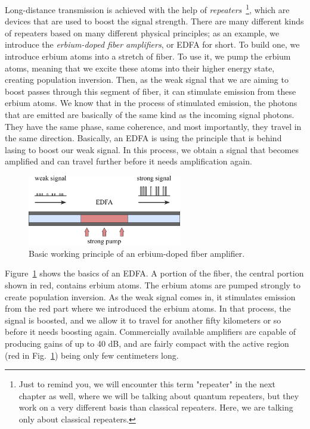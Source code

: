 Long-distance transmission is achieved with the help of \emph{repeaters}~\footnote{Just to remind you, we will encounter this term "repeater" in the next chapter as well, where we will be talking about quantum repeaters, but they work on a very different basis than classical repeaters. Here, we are talking only about classical repeaters.}, which are devices that are used to boost the signal strength. There are many different kinds of repeaters based on many different physical principles; as an example, we introduce the \emph{erbium-doped fiber amplifiers}, or EDFA for short. To build one, we introduce erbium atoms into a stretch of fiber. To use it, we pump the erbium atoms, meaning that we excite these atoms into their higher energy state, creating population inversion. Then, as the weak signal that we are aiming to boost passes through this segment of fiber, it can stimulate emission from these erbium atoms. We know that in the process of stimulated emission, the photons that are emitted are basically of the same kind as the incoming signal photons. They have the same phase, same coherence, and most importantly, they travel in the same direction. Basically, an EDFA is using the principle that is behind lasing to boost our weak signal. In this process, we obtain a signal that becomes amplified and can travel further before it needs amplification again.

\begin{figure}[t]
    \centering
    \includegraphics[width=0.6\textwidth]{lesson11/11-4_edfa.pdf}
    \caption[EDFA]{Basic working principle of an erbium-doped fiber amplifier.}
    \label{fig:11-4_edfa}
\end{figure}

Figure~\ref{fig:11-4_edfa} shows the basics of an EDFA.
A portion of the fiber, the central portion shown in red, contains erbium atoms. The erbium atoms are pumped strongly to create population inversion. As the weak signal comes in, it stimulates emission from the red part where we introduced the erbium atoms. In that process, the signal is boosted, and we allow it to travel for another fifty kilometers or so before it needs boosting again.
Commercially available amplifiers are capable of producing gains of up to 40 dB, and are fairly compact with the active region (red in Fig.~\ref{fig:11-4_edfa}) being only few centimeters long.

